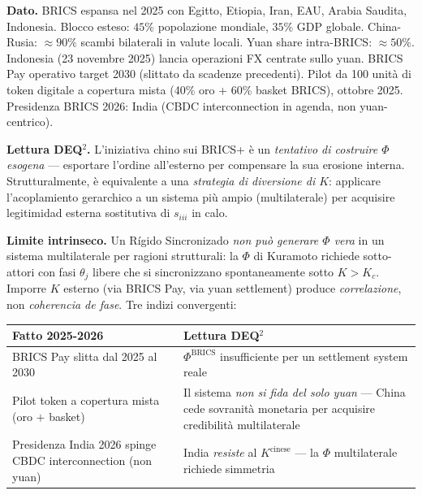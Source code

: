 \Proved{} \textbf{Dato.} BRICS espansa nel 2025 con Egitto, Etiopia,
Iran, EAU, Arabia Saudita, Indonesia. Blocco esteso: \(45\%\)
popolazione mondiale, \(35\%\) GDP globale. China-Rusia:
\(\approx 90\%\) scambi bilaterali in valute locali. Yuan share
intra-BRICS: \(\approx 50\%\). Indonesia (23 novembre 2025) lancia
operazioni FX centrate sullo yuan. BRICS Pay operativo target 2030
(slittato da scadenze precedenti). Pilot da 100 unità di token digitale
a copertura mista (40\% oro + 60\% basket BRICS), ottobre 2025.
Presidenza BRICS 2026: India (CBDC interconnection in agenda, non
yuan-centrico).

\Hypoth{} \textbf{Lettura DEQ$^2$.} L'iniziativa chino sui BRICS+ è un
\emph{tentativo di costruire \(\Phi\) esogena} --- esportare l'ordine
all'esterno per compensare la sua erosione interna. Strutturalmente, è
equivalente a una \emph{strategia di diversione di \(K\)}: applicare
l'acoplamiento gerarchico a un sistema più ampio (multilaterale) per
acquisire legitimidad esterna sostitutiva di \(s_{iii}\) in calo.

\Proved{} \textbf{Limite intrinseco.} Un Rígido Sincronizado \emph{non
può generare \(\Phi\) vera} in un sistema multilaterale per ragioni
strutturali: la \(\Phi\) di Kuramoto richiede sotto-attori con fasi
\(\theta_j\) libere che si sincronizzano spontaneamente sotto
\(K > K_c\). Imporre \(K\) esterno (via BRICS Pay, via yuan settlement)
produce \emph{correlazione}, non \emph{coherencia de fase}. Tre indizi
convergenti:

{\def\LTcaptype{none} %
{\small\begin{longtable}[]{@{}
  >{\raggedright\arraybackslash}p{}
  >{\raggedright\arraybackslash}p{}@{}}
\toprule\noalign{}
\begin{minipage}[b]{\linewidth}\raggedright
Fatto 2025-2026
\end{minipage} & \begin{minipage}[b]{\linewidth}\raggedright
Lettura DEQ$^2$
\end{minipage} \\
\midrule\noalign{}
\endhead
\bottomrule\noalign{}
\endlastfoot
BRICS Pay slitta dal 2025 al 2030 & \(\Phi^{\text{BRICS}}\)
insufficiente per un settlement system reale \\
Pilot token a copertura mista (oro \(+\) basket) & Il sistema \emph{non
si fida del solo yuan} --- China cede sovranità monetaria per acquisire
credibilità multilaterale \\
Presidenza India 2026 spinge CBDC interconnection (non yuan) & India
\emph{resiste} al \(K^{\text{cinese}}\) --- la \(\Phi\) multilaterale
richiede simmetria \\
\end{longtable}}
}

